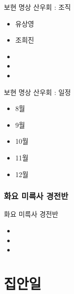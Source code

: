 \documentclass[aspectratio=1610,17pt,xcolor=pdftex,dvipsnames,table,handout]{beamer}
\begin{document}
		\begin{frame} [t,plain]
			\begin{block} {보현 명상 산우회 : 조직}
			\begin{itemize}
				\item 유상영
				\item 조희진
				\item 
				\item 
				\item 
			\end{itemize}
			\end{block}
		\end{frame}

		\begin{frame} [t,plain]
			\begin{block} {보현 명상 산우회 : 일정}
			\begin{itemize}
				\item 8월
				\item 9월
				\item 10월
				\item 11월
				\item 12월
			\end{itemize}
			\end{block}
		\end{frame}



		\section{화요 미륵사 경전반}

		\begin{frame} [t,plain]
			\begin{block} {화요 미륵사 경전반}
			\begin{itemize}
				\item 
				\item 
				\item 
			\end{itemize}
			\end{block}
		\end{frame}


		\part{집안일}
		\frame{\partpage}
\end{document}
